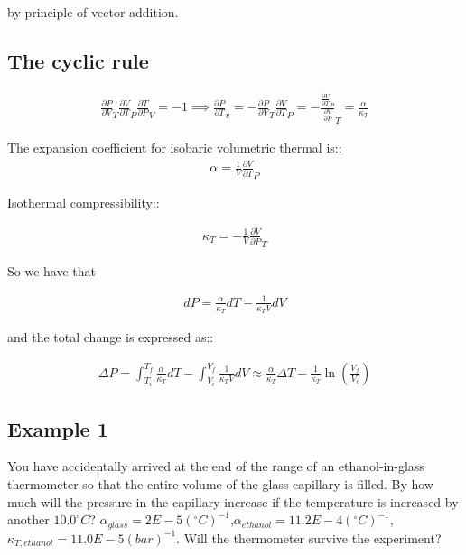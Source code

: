 \documentclass[12pt]{book}
\begin{document}
by principle of vector addition.

\subsection*{The cyclic rule}

\begin{align*}
    \frac{\partial P}{\partial V}_T\frac{\partial V}{\partial T}_P\frac{\partial T}{\partial P}_V=-1\implies \frac{\partial P}{\partial T}_v=-\frac{\partial P}{\partial V}_T\frac{\partial V}{\partial T}_P=-\frac{\frac{\partial V}{\partial T}_P}{\frac{\partial V}{\partial P}}_T=\frac{\alpha}{\kappa_T}
\end{align*}

The expansion coefficient for isobaric volumetric thermal is::
\begin{align*}
    \alpha=\frac{1}{V}\frac{\partial V}{\partial T}_P
\end{align*}

Isothermal compressibility::

\begin{align*}
    \kappa_T=-\frac{1}{V}\frac{\partial V}{\partial P}_T
\end{align*}

So we have that

\begin{align*}
    dP=\frac{\alpha}{\kappa_T}dT-\frac{1}{\kappa_T V}dV
\end{align*}

and the total change is expressed as::

\begin{align*}
    \Delta P=\int_{T_i}^{T_f}\frac{\alpha}{\kappa_T}dT-\int_{V_i}^{V_f}\frac{1}{\kappa_T V}dV\approx \frac{\alpha}{\kappa_T}\Delta T-\frac{1}{\kappa_T}\ln(\frac{V_f}{V_i})
\end{align*}

\subsection*{Example 1}

You have accidentally arrived at the end of the range of an ethanol-in-glass
thermometer so that the entire volume of the glass capillary is filled. By how much
will the pressure in the capillary increase if the temperature is increased by another $10.0^{\circ}C$? $\alpha_{glass}=2E-5(^{\circ}C)^{-1}$,$\alpha_{ethanol}=11.2E-4(^{\circ}C)^{-1}$, $\kappa_{T,ethanol}=11.0E-5(bar)^{-1}$. Will the thermometer survive the experiment?
\end{document}
